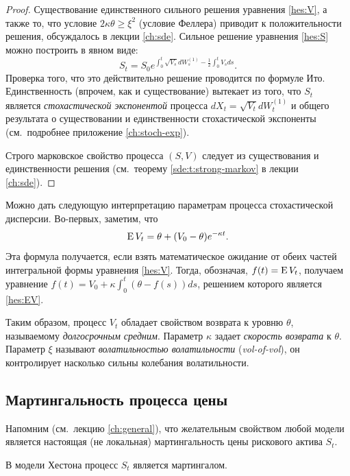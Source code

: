 \begin{proof}
Существование единственного сильного решения уравнения \eqref{hes:V}, а также то, что условие $2\kappa\theta\ge\xi^2$ (условие Феллера) приводит к положительности решения, обсуждалось в лекции \ref{ch:sde}.
Сильное решение уравнения \eqref{hes:S} можно построить в явном виде:
\[
S_t = S_0 e^{\int_0^t \sqrt{V_s} dW_s^{(1)}  - \frac12 \int_0^t V_s ds}.
\]
Проверка того, что это действительно решение проводится по формуле Ито.
Единственность (впрочем, как и существование) вытекает из того, что $S_t$ является \emph{стохастической экспонентой} процесса $d X_t = \sqrt{V_t} dW_t^{(1)}$ и общего результата о существовании и единственности стохастической экспоненты (см.~подробнее приложение \ref{ch:stoch-exp}).

Строго марковское свойство процесса $(S,V)$ следует из существования и единственности решения (см.~теорему \ref{sde:t:strong-markov} в лекции \ref{ch:sde}).
\end{proof}

Можно дать следующую интерпретацию параметрам процесса стохастической дисперсии.
Во-первых, заметим, что
\begin{equation}
\label{hes:EV}  
\operatorname{E} V_t = \theta + (V_0 - \theta)e^{-\kappa t}.
\end{equation}
Эта формула получается, если взять математическое ожидание от обеих частей интегральной формы уравнения \eqref{hes:V}.
Тогда, обозначая, $f(t) = \operatorname{E} V_t$, получаем уравнение $f(t) = V_0 + \kappa\int_0^t (\theta - f(s))ds$, решением которого является \eqref{hes:EV}.

Таким образом, процесс $V_t$ обладает свойством возврата к уровню $\theta$, называемому \emph{долгосрочным средним}.
Параметр $\kappa$ задает \emph{скорость возврата} к $\theta$.
Параметр $\xi$ называют \emph{волатильностью волатильности} (\emph{vol-of-vol}), он контролирует насколько сильны колебания волатильности.


\subsection{Мартингальность процесса цены \difficult}

Напомним (см.~лекцию \ref{ch:general}), что желательным свойством любой модели является настоящая (не локальная) мартингальность цены рискового актива $S_t$.

\begin{proposition}
\label{hes:p:price-martingale}
В модели Хестона процесс $S_t$ является мартингалом.
\end{proposition}

